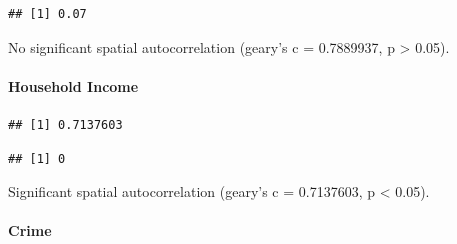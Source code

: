 \documentclass[
]{article}
\newenvironment{Shaded}{\begin{snugshade}}{\end{snugshade}}
\newcommand{\ControlFlowTok}[1]{\textcolor[rgb]{0.13,0.29,0.53}{\textbf{#1}}}
\newcommand{\DecValTok}[1]{\textcolor[rgb]{0.00,0.00,0.81}{#1}}
\newcommand{\DocumentationTok}[1]{\textcolor[rgb]{0.56,0.35,0.01}{\textbf{\textit{#1}}}}
\newcommand{\FunctionTok}[1]{\textcolor[rgb]{0.00,0.00,0.00}{#1}}
\newcommand{\NormalTok}[1]{#1}
\newcommand{\OtherTok}[1]{\textcolor[rgb]{0.56,0.35,0.01}{#1}}
\newcommand{\SpecialCharTok}[1]{\textcolor[rgb]{0.00,0.00,0.00}{#1}}
\newcommand{\StringTok}[1]{\textcolor[rgb]{0.31,0.60,0.02}{#1}}
\begin{document}
\begin{verbatim}
## [1] 0.07
\end{verbatim}

No significant spatial autocorrelation (geary's c = 0.7889937, p
\textgreater{} 0.05).

\hypertarget{household-income-1}{%
\paragraph{Household Income}\label{household-income-1}}

\begin{Shaded}
\end{Shaded}

\begin{verbatim}
## [1] 0.7137603
\end{verbatim}

\begin{Shaded}
\end{Shaded}

\begin{verbatim}
## [1] 0
\end{verbatim}

Significant spatial autocorrelation (geary's c = 0.7137603, p
\textless{} 0.05).

\hypertarget{crime-1}{%
\paragraph{Crime}\label{crime-1}}
\end{document}
